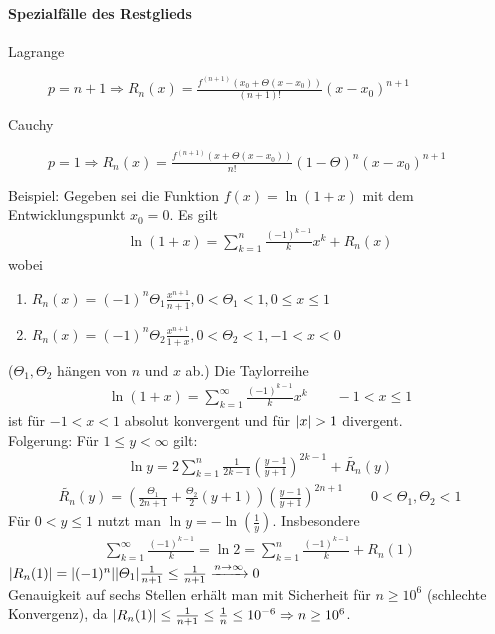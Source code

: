 \documentclass[ngerman,titlepage,twoside, parskip=half*]{scrreprt}
\theoremstyle{break}
\theoremstyle{nonumberbreak}
\DeclarePairedDelimiter{\abs}{\lvert}{\rvert}
\begin{document}
\paragraph{Spezialfälle des Restglieds}
\begin{description}
  \item[Lagrange] $p=n+1\Rightarrow R_n(x)=\frac{f^{(n+1)}(x_0+\Theta(x-x_0))}{(n+1)!}(x-x_0)^{n+1}$
  \item[Cauchy] $p=1\Rightarrow R_n(x)=\frac{f^{(n+1)}(x+\Theta(x-x_0))}{n!}(1-\Theta)^n(x-x_0)^{n+1}$
\end{description}

Beispiel: Gegeben sei die Funktion $f(x)=\ln(1+x)$ mit dem
Entwicklungspunkt $x_0=0$. Es gilt
\begin{gather}
  \label{eq:y2}
  \ln(1+x)=\sum_{k=1}^n \frac{(-1)^{k-1}}{k}x^k+R_n(x)
\end{gather}
wobei
\begin{enumerate}
  \item $R_n(x)=(-1)^n\Theta_1\frac{x^{n+1}}{n+1}, 0<\Theta_1<1, 0\leq x\leq 1$
  \item $R_n(x)=(-1)^n\Theta_2\frac{x^{n+1}}{1+x}, 0<\Theta_2<1, -1<x<0$
\end{enumerate}
($\Theta_1, \Theta_2$ hängen von $n$ und $x$ ab.)
Die Taylorreihe
\begin{gather*}\ln(1+x)=\sum_{k=1}^\infty \frac{(-1)^{k-1}}{k}x^k\qquad -1<x\leq 1\end{gather*}
ist für $-1<x<1$ absolut konvergent und für $\abs{x}>1$ divergent.\\
Folgerung: Für $1\leq y<\infty$ gilt: 
\begin{gather*}
  \ln y=2\sum_{k=1}^n \frac{1}{2k-1}\left(\frac{y-1}{y+1}\right)^{2k-1}
  +\widetilde{R_n}(y)
\end{gather*}
\begin{gather*}\widetilde{R_n}(y)=\left(\frac{\Theta_1}{2n+1}+\frac{\Theta_2}{2}(y+1)\right)
\left(\frac{y-1}{y+1}\right)^{2n+1}\qquad 0<\Theta_1,\Theta_2<1\end{gather*}
Für $0<y\leq 1$ nutzt man $\ln y=-\ln(\frac{1}{y})$. Insbesondere
\begin{gather*}\sum_{k=1}^\infty \frac{(-1)^{k-1}}{k}=\ln 2=\sum_{k=1}^n
\frac{(-1)^{k-1}}{k}+R_n(1)\end{gather*}
$\abs{R_n(1)}=\abs{(-1)^n}\abs{\Theta_1}\frac{1}{n+1}\leq\frac{1}{n+1}
\xrightarrow{n\rightarrow\infty}0$\\
Genauigkeit auf sechs Stellen erhält man mit Sicherheit für $n\geq 10^6$
(schlechte Konvergenz), da  $\abs{R_n(1)}\leq \frac{1}{n+1}\leq \frac{1}{n}\leq 10^{-6}
\Rightarrow n\geq 10^6$.
\end{document}
